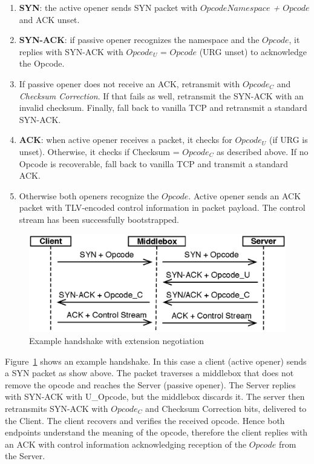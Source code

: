 \documentclass{sig-alternate-10pt}
\begin{document}
\begin{enumerate}
\item \textbf{SYN}: the active opener sends SYN packet with \emph{$Opcode Namespace$ + $Opcode$} and ACK unset.
\item \textbf{SYN-ACK}: if passive opener recognizes the namespace and the $Opcode$, it replies with SYN-ACK with $Opcode_U$ = $Opcode$ (URG unset) to acknowledge the Opcode.
\item If passive opener does not receive an ACK, retransmit with $Opcode_C$ and \emph{Checksum Correction}. If that fails as well, retransmit the SYN-ACK with an invalid checksum. Finally, fall back to vanilla TCP and retransmit a standard SYN-ACK.
\item \textbf{ACK}: when active opener receives a packet, it checks for $Opcode_U$ (if URG is unset). Otherwise, it checks if Checksum = $Opcode_C$ as described above. If no Opcode is recoverable, fall back to vanilla TCP and transmit a standard ACK.
\item Otherwise both openers recognize the $Opcode$. Active opener sends an ACK packet with TLV-encoded control information in packet payload. The control stream has been successfully bootstrapped.
\end{enumerate}

\begin{figure}[t!]
\centering
\includegraphics[width=.9\columnwidth]{figs/handshake}
\caption{Example handshake with extension negotiation}
\label{fig:handshake}
\end{figure}

Figure~\ref{fig:handshake} shows an example handshake. In this case a client (active opener) sends a SYN packet as show above. The packet traverses a middlebox that does not remove the opcode and reaches the Server (passive opener). The Server replies with SYN-ACK with U\_Opcode, but the middlebox discards it. The server then retransmits SYN-ACK with $Opcode_C$ and Checksum Correction bits, delivered to the Client. The client recovers and verifies the received opcode. Hence both endpoints understand the meaning of the opcode, therefore the client replies with an ACK with control information acknowledging reception of the $Opcode$ from the Server.
\end{document}
